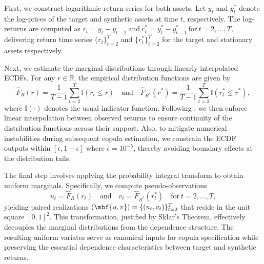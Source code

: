 First, we construct logarithmic return series for both assets. Let $y_t$ and $y_t^*$ denote the log-prices of the target and synthetic assets at time $t$, respectively. The log-returns are computed as  
$
r_t = y_t - y_{t-1} 
~\text{and}~ 
r_t^* = y_t^* - y_{t-1}^* 
~\text{for}\ t = 2,\ldots,T,
$  
delivering return time series $\{r_t\}_{t=2}^T$ and $\{r_t^*\}_{t=2}^T$ for the target and stationary assets respectively. 

Next, we estimate the marginal distributions through linearly interpolated ECDFs. For any $r \in \mathbb{R}$, the empirical distribution functions are given by  
$$
\hat{F}_{R}(r) = \frac{1}{T-1} \sum_{t=2}^T \mathbb{I}(r_t \leq r) \quad \text{and} \quad \hat{F}_{R^*}(r^*) = \frac{1}{T-1} \sum_{t=2}^T \mathbb{I}(r_t^* \leq r^*),
$$  
where $\mathbb{I}(\cdot)$ denotes the usual indicator function. Following \cite{hudsonthames2024}, we then enforce linear interpolation between observed returns to ensure continuity of the distribution functions across their support. Also, to mitigate numerical instabilities during subsequent copula estimation, we constrain the ECDF outputs within $[\epsilon, 1-\epsilon]$ where $\epsilon = 10^{-5}$, thereby avoiding boundary effects at the distribution tails.

The final step involves applying the probability integral transform to obtain uniform marginals. Specifically, we compute pseudo-observations  
$$
u_t = \hat{F}_R(r_t) \quad \text{and} \quad v_t = \hat{F}_{R^*}(r_t^*) \quad \text{for}\ t = 2,\ldots,T,
$$  
yielding paired realizations $(\mbf {u,v})=\{(u_t,v_t)\}_{t=2}^T$ that reside in the unit square $[0,1]^2$. This transformation, justified by Sklar's Theorem, effectively decouples the marginal distributions from the dependence structure. The resulting uniform variates serve as canonical inputs for copula specification while preserving the essential dependence characteristics between target and synthetic returns. 


